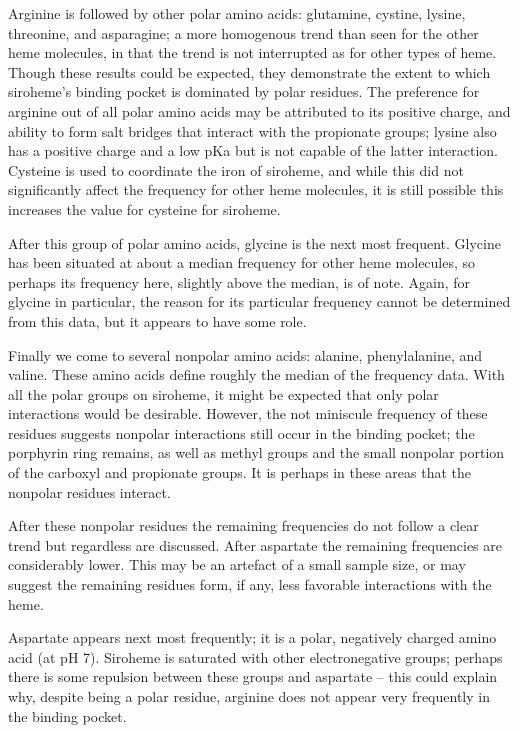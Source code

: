 \documentclass[a4paper, nobind]{templates/ociamthesis}
\begin{document}
Arginine is followed by other polar amino acids: glutamine, cystine, lysine, threonine, and asparagine; a more homogenous trend than seen for the other heme molecules, in that the trend is not interrupted as for other types of heme. Though these results could be expected, they demonstrate the extent to which siroheme's binding pocket is dominated by polar residues. The preference for arginine out of all polar amino acids may be attributed to its positive charge, and ability to form salt bridges that interact with the propionate groups; lysine also has a positive charge and a low pKa but is not capable of the latter interaction. Cysteine is used to coordinate the iron of siroheme, and while this did not significantly affect the frequency for other heme molecules, it is still possible this increases the value for cysteine for siroheme.

After this group of polar amino acids, glycine is the next most frequent. Glycine has been situated at about a median frequency for other heme molecules, so perhaps its frequency here, slightly above the median, is of note. Again, for glycine in particular, the reason for its particular frequency cannot be determined from this data, but it appears to have some role.

Finally we come to several nonpolar amino acids: alanine, phenylalanine, and valine. These amino acids define roughly the median of the frequency data. With all the polar groups on siroheme, it might be expected that only polar interactions would be desirable. However, the not miniscule frequency of these residues suggests nonpolar interactions still occur in the binding pocket; the porphyrin ring remains, as well as methyl groups and the small nonpolar portion of the carboxyl and propionate groups. It is perhaps in these areas that the nonpolar residues interact.

After these nonpolar residues the remaining frequencies do not follow a clear trend but regardless are discussed. After aspartate the remaining frequencies are considerably lower. This may be an artefact of a small sample size, or may suggest the remaining residues form, if any, less favorable interactions with the heme.

Aspartate appears next most frequently; it is a polar, negatively charged amino acid (at pH 7). Siroheme is saturated with other electronegative groups; perhaps there is some repulsion between these groups and aspartate -- this could explain why, despite being a polar residue, arginine does not appear very frequently in the binding pocket.
\end{document}
